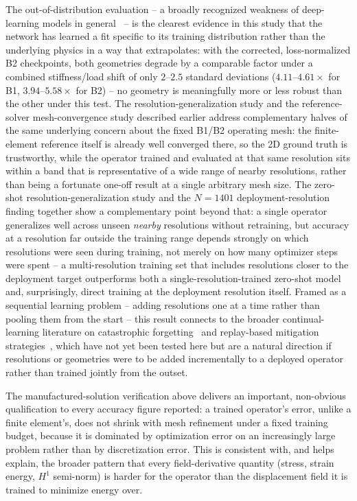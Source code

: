 \documentclass[final,5p,times]{elsarticle}
\begin{document}
The out-of-distribution evaluation -- a broadly recognized weakness of
deep-learning models in general~\cite{liu2021oodsurvey} -- is the clearest
evidence in this study that the network has learned a fit specific to its
training distribution rather than the underlying physics in a way that
extrapolates: with the corrected, loss-normalized B2 checkpoints, both
geometries degrade by a comparable factor under a combined stiffness/load
shift of only $2$--$2.5$ standard deviations ($4.11$--$4.61\times$ for B1,
$3.94$--$5.58\times$ for B2) -- no geometry
is meaningfully more or less robust than the other under this test. The
resolution-generalization study and the
reference-solver mesh-convergence study described earlier
address complementary halves of the same underlying concern about the
fixed B1/B2 operating mesh: the finite-element reference itself is
already well converged there, so the 2D ground truth is trustworthy, while the operator trained and evaluated at
that same resolution sits within a band that is representative of a wide
range of nearby resolutions, rather than being a fortunate one-off result
at a single arbitrary mesh size. The zero-shot resolution-generalization study
and the $N{=}1401$ deployment-resolution finding together show a
complementary point beyond that: a single operator generalizes well across
unseen \emph{nearby} resolutions without retraining, but accuracy at a
resolution far outside the training range depends strongly on which
resolutions were seen during training, not merely on how many optimizer
steps were spent -- a multi-resolution training set that includes
resolutions closer to the deployment target outperforms both a
single-resolution-trained zero-shot model and, surprisingly, direct
training at the deployment resolution itself. Framed as a sequential
learning problem -- adding resolutions one at a time rather than pooling
them from the start -- this result connects to the broader continual-
learning literature on catastrophic
forgetting~\cite{kirkpatrick2017overcoming} and replay-based mitigation
strategies~\cite{wang2025replay}, which have not yet been tested here but
are a natural direction if resolutions or geometries were to be added
incrementally to a deployed operator rather than trained jointly from the
outset.

The manufactured-solution verification above delivers an important,
non-obvious qualification to every accuracy figure
reported: a trained operator's error, unlike a finite element's, does not
shrink with mesh refinement under a fixed training budget, because it is
dominated by optimization error on an increasingly large problem rather than
by discretization error. This is consistent with, and helps explain, the
broader pattern that every field-derivative quantity (stress, strain
energy, $H^1$ semi-norm) is harder for the operator than the displacement
field it is trained to minimize energy over.
\end{document}
